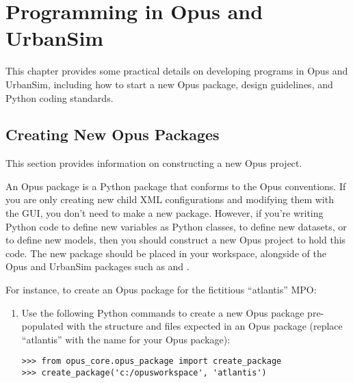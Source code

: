 
\chapter{Programming in Opus and UrbanSim}
\label{chapter:programming}

This chapter provides some practical details on developing programs in Opus
and UrbanSim, including how to start a new Opus package, design guidelines,
and Python coding standards.

\section{Creating New Opus Packages}
\label{sec:create-opus-package}

This section provides information on constructing a new Opus project.

An Opus package is a Python package \pythonpackagesindex that conforms to the
Opus conventions.  If you are only creating new child XML configurations and
modifying them with the GUI, you don't need to make a new package.  However, if
you're writing Python code to define new variables as Python classes, to define new 
datasets, or to define new models, then you should construct a new Opus project 
to hold this code.  The new package should be 
placed in your workspace, alongside of the Opus and UrbanSim packages such as 
 and .

For instance, to create an
Opus package for the fictitious ``atlantis'' MPO:

\begin{enumerate}
  \item Use the following Python commands to create a new  Opus
  package pre-populated with the structure and files expected in an Opus package
  (replace ``atlantis'' with the name for your Opus package):
\begin{verbatim}
>>> from opus_core.opus_package import create_package
>>> create_package('c:/opusworkspace', 'atlantis')
\end{verbatim}
\end{enumerate}

